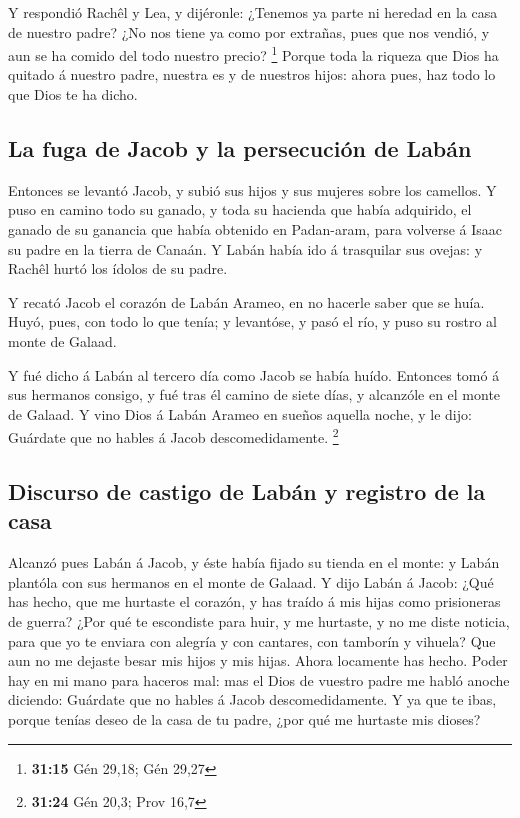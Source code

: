  Y respondió Rachêl y Lea, y dijéronle: ¿Tenemos ya parte
ni heredad en la casa de nuestro padre?  ¿No nos tiene ya
como por extrañas, pues que nos vendió, y aun se ha comido del todo
nuestro precio? \footnote{\textbf{31:15} Gén 29,18; Gén 29,27}
 Porque toda la riqueza que Dios ha quitado á nuestro
padre, nuestra es y de nuestros hijos: ahora pues, haz todo lo que Dios
te ha dicho.

\hypertarget{la-fuga-de-jacob-y-la-persecuciuxf3n-de-labuxe1n}{%
\subsection{La fuga de Jacob y la persecución de
Labán}\label{la-fuga-de-jacob-y-la-persecuciuxf3n-de-labuxe1n}}

 Entonces se levantó Jacob, y subió sus hijos y sus
mujeres sobre los camellos.  Y puso en camino todo su
ganado, y toda su hacienda que había adquirido, el ganado de su ganancia
que había obtenido en Padan-aram, para volverse á Isaac su padre en la
tierra de Canaán.  Y Labán había ido á trasquilar sus
ovejas: y Rachêl hurtó los ídolos de su padre.

 Y recató Jacob el corazón de Labán Arameo, en no hacerle
saber que se huía.  Huyó, pues, con todo lo que tenía; y
levantóse, y pasó el río, y puso su rostro al monte de Galaad.

 Y fué dicho á Labán al tercero día como Jacob se había
huído.  Entonces tomó á sus hermanos consigo, y fué tras
él camino de siete días, y alcanzóle en el monte de Galaad.
 Y vino Dios á Labán Arameo en sueños aquella noche, y le
dijo: Guárdate que no hables á Jacob descomedidamente. \footnote{\textbf{31:24}
  Gén 20,3; Prov 16,7}

\hypertarget{discurso-de-castigo-de-labuxe1n-y-registro-de-la-casa}{%
\subsection{Discurso de castigo de Labán y registro de la
casa}\label{discurso-de-castigo-de-labuxe1n-y-registro-de-la-casa}}

 Alcanzó pues Labán á Jacob, y éste había fijado su
tienda en el monte: y Labán plantóla con sus hermanos en el monte de
Galaad.  Y dijo Labán á Jacob: ¿Qué has hecho, que me
hurtaste el corazón, y has traído á mis hijas como prisioneras de
guerra?  ¿Por qué te escondiste para huir, y me hurtaste,
y no me diste noticia, para que yo te enviara con alegría y con
cantares, con tamborín y vihuela?  Que aun no me dejaste
besar mis hijos y mis hijas. Ahora locamente has hecho. 
Poder hay en mi mano para haceros mal: mas el Dios de vuestro padre me
habló anoche diciendo: Guárdate que no hables á Jacob descomedidamente.
 Y ya que te ibas, porque tenías deseo de la casa de tu
padre, ¿por qué me hurtaste mis dioses?

